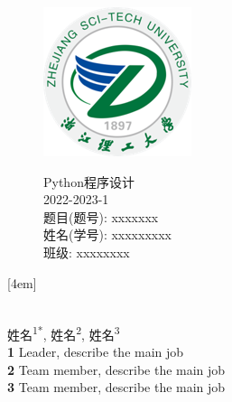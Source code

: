 \documentclass[12pt]{article}
\begin{document}
\begin{figure}[h!]
\begin{minipage}[b]{\textwidth}
\centering
\includegraphics[scale=1.5]{./logo.png}
\end{minipage}
\begin{minipage}[b][30em]{\textwidth}
\centering
\Huge{Python程序设计} \vspace{1.5cm}\\
\huge{2022-2023-1} \vspace{1.5cm}\\
题目(题号): xxxxxxx\\
姓名(学号): xxxxxxxxx\\
班级: xxxxxxxx\\
\end{minipage}
\end{figure}
\date{}
\setcounter{page}{0}
\thispagestyle{empty}
\newpage

\begin{center}
[4em]
{\bf \large}
{\contentslabel{2em}}
{}
{\titlerule*[1em]{$\cdot$}\contentspage}

\tableofcontents
\end{center}

\setcounter{page}{0} %
\thispagestyle{empty}
\newpage

\normalsize
\begin{center}
{\Large
\textbf{} 
\
}
\newline  
\\
姓名\textsuperscript{1*},
姓名\textsuperscript{2},
姓名\textsuperscript{3}
\\
\bigskip
\textbf{1} Leader, describe the main job
\\
\textbf{2} Team member, describe the main job
\\
\textbf{3} Team member, describe the main job 
\\
\bigskip
%
\end{center}
\end{document}
